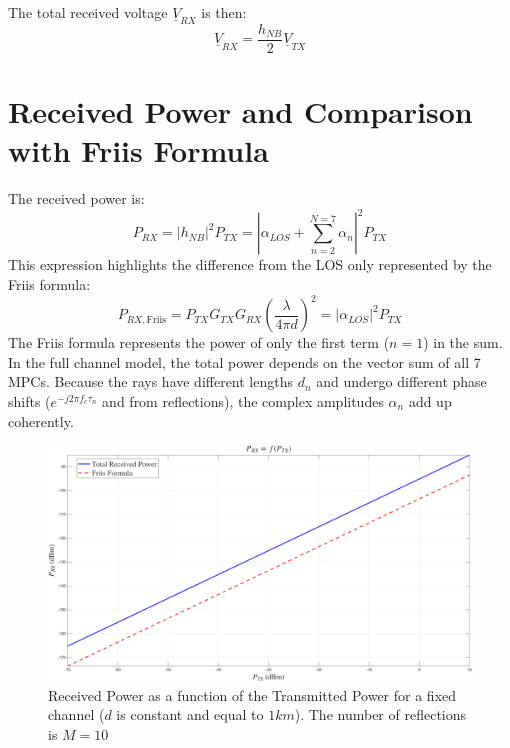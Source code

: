 The total received voltage $\underline{V}_{RX}$ is then:
\begin{equation}
	\underline{V}_{RX} = \frac{h_{NB}}{2} \underline{V}_{TX}
\end{equation}

\section{Received Power and Comparison with Friis Formula}

The received power is:
\begin{equation}
	P_{RX} = |h_{NB}|^2 P_{TX} = \left| \alpha_{LOS} + \sum_{n=2}^{N=7} \alpha_n \right|^2 P_{TX}
\end{equation}
This expression highlights the difference from the LOS only represented by the Friis formula:
\begin{equation}
	P_{RX, \text{Friis}} = P_{TX} G_{TX} G_{RX} \left( \frac{\lambda}{4\pi d} \right)^2 = |\alpha_{LOS}|^2 P_{TX}
\end{equation}
The Friis formula represents the power of only the first term ($n=1$) in the sum. In the full channel model, the total power depends on the vector sum of all 7 MPCs. Because the rays have different lengths $d_n$ and undergo different phase shifts ($e^{-j2\pi f_c \tau_n}$ and from reflections), the complex amplitudes $\alpha_n$ add up coherently.

\begin{figure}[H]
	\centering
	\includegraphics[width=1\linewidth]{content/4-images/PRX-vs-PTX}
	\caption{Received Power as a function of the Transmitted Power for a fixed channel ($d$ is constant and equal to $1km$). The number of reflections is $M=10$}
	\label{fig:prx-vs-ptx}
\end{figure}


